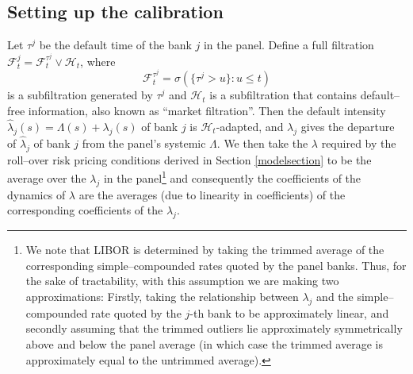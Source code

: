 \documentclass[12pt,a4paper]{article}
\theoremstyle{plain}
\numberwithin{equation}{section}
\begin{document}
\subsection{Setting up the calibration}
Let $\tau^j$ be the default time of the bank $j$ in the panel. Define a full filtration $\mathcal{F}^j_t=\mathcal{F}_t^{\tau^j}\vee \mathcal{H}_t$, where
\[\mathcal{F}_t^{\tau^j}=\sigma(\{\tau^j>u\}:u\leq t)\]
is a subfiltration generated by $\tau^j$ and $\mathcal{H}_t$ is a subfiltration that contains default--free information, also known as ``market filtration''. Then the default intensity $\hat\lambda_j(s)=\Lambda(s)+\lambda_j(s)$ of bank $j$ is $\mathcal{H}_t$-adapted, and $\lambda_j$ gives the departure of $\hat\lambda_j$ of bank $j$ from the panel's systemic $\Lambda$. We then take the $\lambda$ required by the roll--over risk pricing conditions derived in Section \ref{modelsection} to be the average over the $\lambda_j$ in the panel\footnote{We note that LIBOR is determined by taking the trimmed average of the corresponding simple--compounded rates quoted by the panel banks. Thus, for the sake of tractability, with this assumption we are making two approximations: Firstly, taking the relationship between $\lambda_j$ and the simple--compounded rate quoted by the $j$-th bank to be approximately linear, and secondly assuming that the trimmed outliers lie approximately symmetrically above and below the panel average (in which case the trimmed average is approximately equal to the untrimmed average).} and consequently the coefficients of the dynamics of $\lambda$ are the averages (due to linearity in coefficients) of the corresponding coefficients of the $\lambda_j$.
\end{document}
